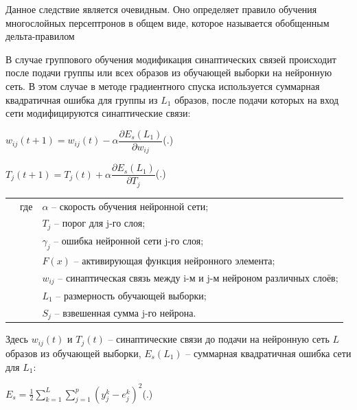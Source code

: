 {	\par \redline Данное следствие является очевидным. Оно определяет правило обучения многослойных персептронов в общем виде, которое называется обобщенным дельта-правилом
	
	\par \redline В случае группового обучения модификация синаптических связей происходит после подачи группы или всех образов из обучающей выборки на нейронную сеть. В этом случае в методе градиентного спуска используется суммарная квадратичная ошибка для группы из $L_1$ образов, после подачи которых на вход сети модифицируются синаптические связи:
	
	\formulaspace \par \redline 
	$w_{ij}(t+1) = w_{ij}(t) - \alpha \dfrac{\partial E_s (L_1)}{\partial w_{ij}} $\hfill (\thechaptercntr .\theformulacntr) \redline
	\formulaspace \addtocounter{formulacntr}{1}
	
	\formulaspace \par \redline 
	$T_{j}(t+1) = T_{j}(t) + \alpha \dfrac{\partial E_s (L_1)}{\partial T_{j}} $\hfill (\thechaptercntr .\theformulacntr) \redline
	\formulaspace \addtocounter{formulacntr}{1}
	
	\begin{tabular}{p{}p{}p{}}
		& где  & $\alpha$ {--} скорость обучения нейронной сети; \\
		&      & $T_{j}$ {--} порог для j-го слоя; \\
		&      & $\gamma_{j}$ {--} ошибка нейронной сети j-го слоя; \\
		&      & $F(x)$ {--} активирующая функция нейронного элемента; \\
		&      & $w_{ij}$ {--} синаптическая связь между i-м и j-м нейроном различных слоёв; \\
		&      & $L_1$ {--} размерность обучающей выборки; \\
		&      & $S_{j}$ {--} взвешенная сумма j-го нейрона. \\
	\end{tabular}
	
	\par \redline Здесь $w_{ij}(t)$ и $T_{j}(t)$ {--} синаптические связи до подачи на нейронную сеть $L$ образов из обучающей выборки, $E_s (L_1)$ {--} суммарная квадратичная ошибка сети для $L_1$:
	
	\formulaspace \par \redline 
	$E_{s} = \frac{1}{2} \sum \limits _{k=1}^{L} \sum \limits _{j=1}^{p} (y_{j}^{k} - e_{j}^{k})^{2} $\hfill (\thechaptercntr .\theformulacntr) \redline
	\formulaspace \addtocounter{formulacntr}{1}
	
}
